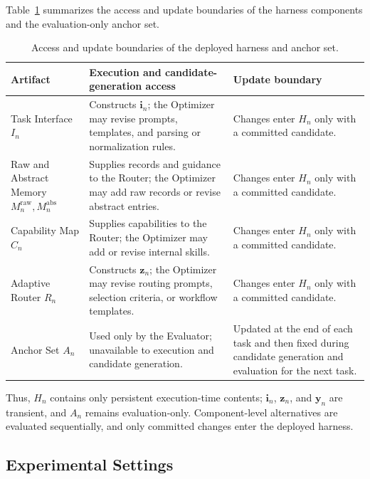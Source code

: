 \documentclass{article}
\begin{document}
Table~\ref{tab:state_access_boundaries} summarizes the access and update
boundaries of the harness components and the evaluation-only anchor set.

\begin{table}[H]
\centering
\small
\caption{Access and update boundaries of the deployed harness and anchor set.}
\label{tab:state_access_boundaries}
\setlength{\tabcolsep}{4pt}
\begin{tabular}{
>{\raggedright\arraybackslash}p{}
>{\raggedright\arraybackslash}p{}
>{\raggedright\arraybackslash}p{}}
\toprule
Artifact & Execution and candidate-generation access & Update boundary \\
\midrule
Task Interface $I_n$
& Constructs $\mathbf{i}_n$; the Optimizer may revise prompts, templates, and
parsing or normalization rules.
& Changes enter $H_n$ only with a committed candidate. \\

Raw and Abstract Memory $M_n^{\mathrm{raw}},M_n^{\mathrm{abs}}$
& Supplies records and guidance to the Router; the Optimizer may add raw
records or revise abstract entries.
& Changes enter $H_n$ only with a committed candidate. \\

Capability Map $C_n$
& Supplies capabilities to the Router; the Optimizer may add or revise
internal skills.
& Changes enter $H_n$ only with a committed candidate. \\

Adaptive Router $R_n$
& Constructs $\mathbf{z}_n$; the Optimizer may revise routing prompts,
selection criteria, or workflow templates.
& Changes enter $H_n$ only with a committed candidate. \\

Anchor Set $A_n$
& Used only by the Evaluator; unavailable to execution and candidate
generation.
& Updated at the end of each task and then fixed during candidate generation
and evaluation for the next task. \\
\bottomrule
\end{tabular}
\end{table}

Thus, $H_n$ contains only persistent execution-time contents;
$\mathbf{i}_n$, $\mathbf{z}_n$, and $\mathbf{y}_n$ are transient, and $A_n$
remains evaluation-only. Component-level alternatives are evaluated
sequentially, and only committed changes enter the deployed harness.

\subsection{Experimental Settings}
\end{document}
